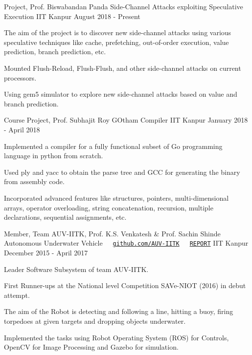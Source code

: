 \documentclass[12pt, a4paper]{awesome-cv}
\begin{document}

\begin{cventries}
  \cventry
    {Project, Prof. Biswabandan Panda}
    {Side-Channel Attacks exploiting Speculative Execution}
    {IIT Kanpur}
    {August 2018 - Present}
    {
      \begin{cvitems}
      \item The aim of the project is to discover new side-channel attacks using various speculative techniques like cache, prefetching, out-of-order execution, value prediction, branch prediction, etc.
      \item Mounted Flush-Reload, Flush-Flush, and other  side-channel attacks on current processors.
      \item Using gem5 simulator to explore new side-channel attacks based on value and branch prediction.
      \end{cvitems}
    }
    \vspace{0.2cm}

  \cventry
    {Course Project, Prof. Subhajit Roy}
    {GOtham Compiler}
    {IIT Kanpur}
    {January 2018 - April 2018}
    {
        \begin{cvitems}
        \item Implemented a compiler for a fully functional subset of Go programming language in python from scratch.
        \item Used ply and yacc to obtain the parse tree and GCC for generating the binary from assembly code.
        \item Incorporated advanced features like structures, pointers, multi-dimensional arrays, operator overloading, string concatenation, recursion, multiple declarations, sequential assignments, etc. 
        \end{cvitems}
    }

  \cventry
    {Member, Team AUV-IITK, Prof. K.S. Venkatesh \& Prof. Sachin Shinde}
    {Autonomous Underwater Vehicle\ \ \ \texttt{\href{https://github.com/AUV-IITK}{github.com/AUV-IITK}}\ \ \ \texttt{\href{https://drive.google.com/file/d/0B8_5kUnCr-WzbnRGV01lcEVTWDA/view?usp=sharing}{REPORT}} }
    {IIT Kanpur}
    {December 2015 - April 2017}
    {
      \begin{cvitems}
        \item {Leader Software Subsystem of team AUV-IITK.}
        \item {First Runner-ups at the National level Competition SAVe-NIOT (2016) in debut attempt.}
        \item {The aim of the Robot is detecting and following a line, hitting a buoy, firing torpedoes at given targets and dropping objects underwater.}
        \item {Implemented the tasks using Robot Operating System (ROS) for Controls, OpenCV for Image Processing and Gazebo for simulation.}        
      \end{cvitems}
    }


\end{cventries}
\end{document}
